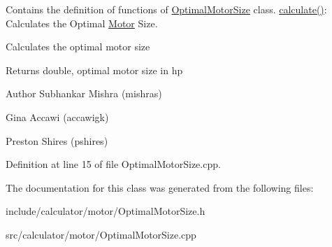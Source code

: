 Contains the definition of functions of \hyperlink{class_optimal_motor_size}{Optimal\+Motor\+Size} class. \hyperlink{class_optimal_motor_size_aa9f4e68b9e1807d20e7738cd0789a539}{calculate()}\+: Calculates the Optimal \hyperlink{struct_motor}{Motor} Size. 

Calculates the optimal motor size \begin{DoxyReturn}{Returns}
double, optimal motor size in hp
\end{DoxyReturn}
\begin{DoxyAuthor}{Author}
Subhankar Mishra (mishras) 

Gina Accawi (accawigk) 

Preston Shires (pshires) 
\end{DoxyAuthor}


Definition at line 15 of file Optimal\+Motor\+Size.\+cpp.



The documentation for this class was generated from the following files\+:\begin{DoxyCompactItemize}
\item 
include/calculator/motor/Optimal\+Motor\+Size.\+h\item 
src/calculator/motor/Optimal\+Motor\+Size.\+cpp\end{DoxyCompactItemize}
